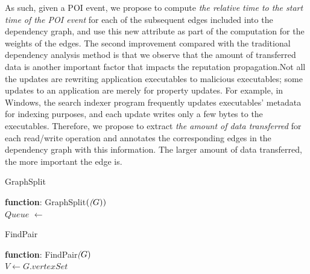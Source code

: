As such, given a POI event, we propose to compute \emph{the relative time to the start time of the POI event} for each of the subsequent edges included into the dependency graph,
and use this new attribute as part of the computation for the weights of the edges. The second  improvement compared with the traditional dependency analysis method is that we observe that the amount of transferred data is another important factor that impacts the reputation propagation.Not all the updates are rewriting application executables to malicious executables; some updates to an application are merely for property updates.
For example, in Windows, the search indexer program frequently updates executables' metadata for indexing purposes, and each update writes only a few bytes to the executables.
Therefore, we propose to extract \emph{the amount of data transferred} for each read/write operation and annotates the corresponding edges in the dependency graph with this information.
The larger amount of data transferred, the more important the edge is.
\begin{algorithm}
	\caption{GraphSplit}
	\textbf{function}: GraphSplit$(\textit(G))$\\
	$Queue$ $\leftarrow$ \;
	\;	
\end{algorithm}
\begin{algorithm}
	\caption{FindPair}
	\textbf{function}: FindPair$\textit(G)$\\
	$V \leftarrow G.vertexSet$\;
\end{algorithm}
